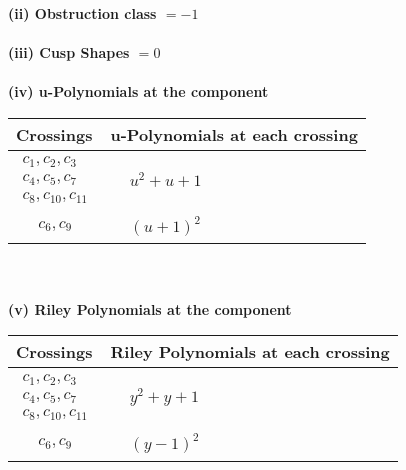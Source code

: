 \documentclass[1p]{elsarticle_modified}
\theoremstyle{definition}
\begin{document}
\flushleft \textbf{(ii) Obstruction class $= -1$}\\~\\
\flushleft \textbf{(iii) Cusp Shapes $= 0$}\\~\\
\newpage\renewcommand{\arraystretch}{1}
\flushleft \textbf{(iv) u-Polynomials at the component}\newline \\
\begin{tabular}{m{50pt}|m{274pt}}
Crossings & \hspace{64pt}u-Polynomials at each crossing \\
\hline $$\begin{aligned}c_{1},c_{2},c_{3}\\c_{4},c_{5},c_{7}\\c_{8},c_{10},c_{11}\end{aligned}$$&$\begin{aligned}
&u^2+u+1
\end{aligned}$\\
\hline $$\begin{aligned}c_{6},c_{9}\end{aligned}$$&$\begin{aligned}
&(u+1)^2
\end{aligned}$\\
\hline
\end{tabular}\\~\\
\newpage\renewcommand{\arraystretch}{1}
\flushleft \textbf{(v) Riley Polynomials at the component}\newline \\
\begin{tabular}{m{50pt}|m{274pt}}
Crossings & \hspace{64pt}Riley Polynomials at each crossing \\
\hline $$\begin{aligned}c_{1},c_{2},c_{3}\\c_{4},c_{5},c_{7}\\c_{8},c_{10},c_{11}\end{aligned}$$&$\begin{aligned}
&y^2+y+1
\end{aligned}$\\
\hline $$\begin{aligned}c_{6},c_{9}\end{aligned}$$&$\begin{aligned}
&(y-1)^2
\end{aligned}$\\
\hline
\end{tabular}\\~\\
\end{document}
